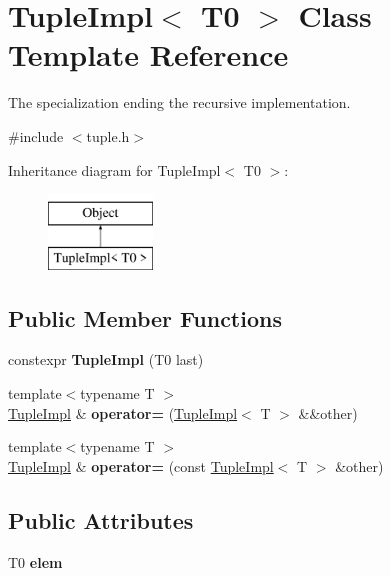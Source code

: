 \hypertarget{classTupleImpl_3_01T0_01_4}{}\section{Tuple\+Impl$<$ T0 $>$ Class Template Reference}
\label{classTupleImpl_3_01T0_01_4}


The specialization ending the recursive implementation.  




{\ttfamily \#include $<$tuple.\+h$>$}

Inheritance diagram for Tuple\+Impl$<$ T0 $>$\+:\begin{figure}[H]
\begin{center}
\leavevmode
\includegraphics[height=2.000000cm]{classTupleImpl_3_01T0_01_4}
\end{center}
\end{figure}
\subsection*{Public Member Functions}
\begin{DoxyCompactItemize}
\item 
\hypertarget{classTupleImpl_3_01T0_01_4_ac7d9015a6c403ec65fc3753875a24d20}{}\label{classTupleImpl_3_01T0_01_4_ac7d9015a6c403ec65fc3753875a24d20} 
constexpr {\bfseries Tuple\+Impl} (T0 last)
\item 
\hypertarget{classTupleImpl_3_01T0_01_4_a1417ea23711bfaf2ee560bd522354059}{}\label{classTupleImpl_3_01T0_01_4_a1417ea23711bfaf2ee560bd522354059} 
{\footnotesize template$<$typename T $>$ }\\\hyperlink{classTupleImpl}{Tuple\+Impl} \& {\bfseries operator=} (\hyperlink{classTupleImpl}{Tuple\+Impl}$<$ T $>$ \&\&other)
\item 
\hypertarget{classTupleImpl_3_01T0_01_4_a9d67cdfb6dd1d28f8e0356163d8c598c}{}\label{classTupleImpl_3_01T0_01_4_a9d67cdfb6dd1d28f8e0356163d8c598c} 
{\footnotesize template$<$typename T $>$ }\\\hyperlink{classTupleImpl}{Tuple\+Impl} \& {\bfseries operator=} (const \hyperlink{classTupleImpl}{Tuple\+Impl}$<$ T $>$ \&other)
\end{DoxyCompactItemize}
\subsection*{Public Attributes}
\begin{DoxyCompactItemize}
\item 
\hypertarget{classTupleImpl_3_01T0_01_4_a6c1be89ad7b1065100d0e836ee548fd0}{}\label{classTupleImpl_3_01T0_01_4_a6c1be89ad7b1065100d0e836ee548fd0} 
T0 {\bfseries elem}
\end{DoxyCompactItemize}


